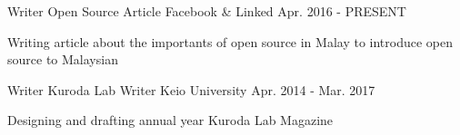 

\begin{cventries}

  \cventry
    { Writer} %
    {Open Source Article} %
	{Facebook \& Linked } %
    {Apr. 2016 - PRESENT} %
    {
      \begin{cvitems} %
        \item {Writing article about the importants of open source in Malay to introduce open source to Malaysian }
      \end{cvitems}
    }

  \cventry
    { Writer} %
    {Kuroda Lab Writer} %
	{Keio University } %
    {Apr. 2014 - Mar. 2017} %
    {
      \begin{cvitems} %
        \item {Designing and drafting annual year Kuroda Lab Magazine}
      \end{cvitems}
    }

\end{cventries}
